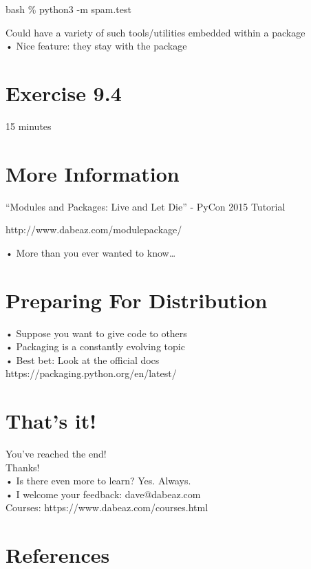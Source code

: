 \documentclass[
  letterpaper,
  DIV=11,
  numbers=noendperiod]{scrreprt}
\begin{document}
bash \% python3 -m spam.test

Could have a variety of such tools/utilities embedded within a package\\
• Nice feature: they stay with the package


\chapter{Exercise 9.4}\label{exercise-9.4}

15 minutes


\chapter{More Information}\label{more-information-1}

``Modules and Packages: Live and Let Die'' - PyCon 2015 Tutorial

http://www.dabeaz.com/modulepackage/

• More than you ever wanted to know\ldots{}


\chapter{Preparing For Distribution}\label{preparing-for-distribution}

• Suppose you want to give code to others\\
• Packaging is a constantly evolving topic\\
• Best bet: Look at the official docs\\
https://packaging.python.org/en/latest/


\chapter{That's it!}\label{thats-it}

You've reached the end!\\
Thanks!\\
• Is there even more to learn? Yes. Always.\\
• I welcome your feedback: dave@dabeaz.com\\
Courses: https://www.dabeaz.com/courses.html


\chapter*{References}\label{references}


\label{refs}
\end{document}
